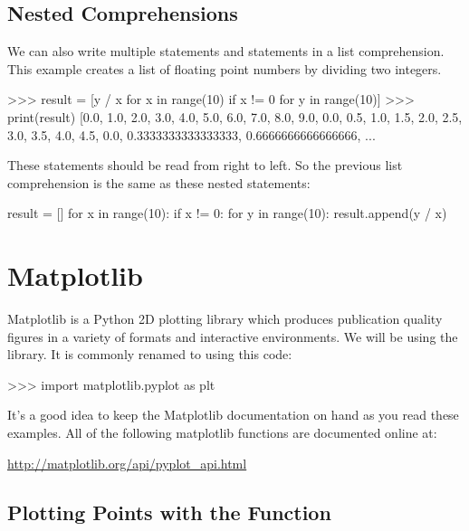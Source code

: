 \documentclass[11pt]{cselabheader}
\begin{document}
\subsection{Nested Comprehensions}

We can also write multiple  statements and
 statements in a list comprehension.
This example creates a list of floating point numbers by dividing
two integers.

\begin{pyconcode}
>>> result = [y / x for x in range(10) if x != 0 for y in range(10)]
>>> print(result)
[0.0, 1.0, 2.0, 3.0, 4.0, 5.0, 6.0, 7.0, 8.0, 9.0, 0.0, 0.5, 1.0, 1.5,
2.0, 2.5, 3.0, 3.5, 4.0, 4.5, 0.0, 0.3333333333333333, 0.6666666666666666, ...
\end{pyconcode}

These statements should be read from right to left. So the previous list
comprehension is the same as these nested statements:

\begin{python3code}
result = []
for x in range(10):
    if x != 0:
        for y in range(10):
            result.append(y / x)
\end{python3code}

\section{Matplotlib}

Matplotlib is a Python 2D plotting library which produces publication
quality figures in a variety of formats and interactive environments.
We will be using the  library. It is
commonly renamed to  using this code:

\begin{pyconcode}
>>> import matplotlib.pyplot as plt
\end{pyconcode}

It's a good idea to keep the Matplotlib documentation on hand as you read these
examples. All of the following matplotlib functions are documented online at:
\begin{center}
\url{http://matplotlib.org/api/pyplot_api.html}
\end{center}

\subsection{Plotting Points with the  Function}
\end{document}
